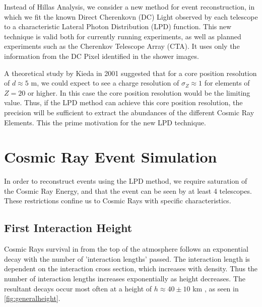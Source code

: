 \documentclass{article}
\begin{document}
Instead of Hillas Analysis, we consider a new method for event reconstruction, in which we fit the known Direct Cherenkovn (DC) Light observed by each telescope to a characteristic Lateral Photon Distribution (LPD) function. This new technique is valid both for currently running experiments, as well as planned experiments such as the Cherenkov Telescope Array (CTA). It uses only the information from the DC Pixel identified in the shower images.

A theoretical study by Kieda in 2001 \cite{kieda01} suggested that for a core position resolution of $d \approx 5 $ m, we could expect to see a charge resolution of $ \sigma_{Z} \approx 1 $ for elements of $Z = 20$ or higher. In this case the core position resolution would be the limiting value. Thus, if the LPD method can achieve this core position resolution, the precision will be sufficient to extract the abundances of the different Cosmic Ray Elements. This the prime motivation for the new LPD technique.

\section{Cosmic Ray Event Simulation}
In order to reconstruct events using the LPD method, we require saturation of the Cosmic Ray Energy, and that the event can be seen by at least 4 telescopes. These restrictions confine us to Cosmic Rays with specific characteristics.

\subsection{First Interaction Height}
Cosmic Rays survival in from the top of the atmosphere follows an exponential decay with the number of 'interaction lengths' passed. The interaction length is dependent on the interaction cross section, which increases with density. Thus the number of interaction lengths increases exponentially as height decreases. The resultant decays occur most often at a height of $h \approx 40 \pm 10$ km , as seen in \ref{fig:generalheight}.
\end{document}
